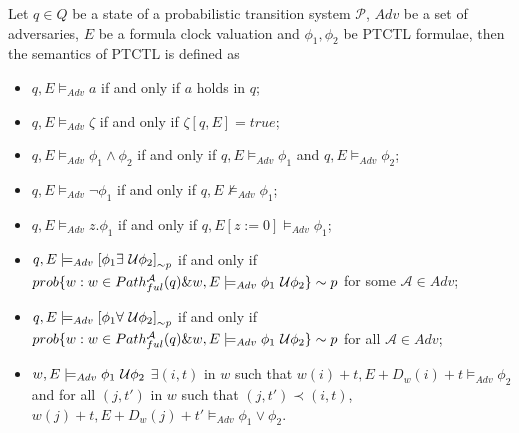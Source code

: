 \begin{defi}
Let $q\in Q$ be a state of a probabilistic transition system $\mathcal{P}$, $Adv$ be a set of adversaries, $E$ be a formula clock valuation and $\phi_{1},\phi_{2}$ be PTCTL formulae, then the semantics of PTCTL is defined as
\begin{itemize}
    \item $q,E\models_{Adv}a$ if and only if $a$ holds in $q$;
    \item $q,E\models_{Adv}\zeta$ if and only if $\zeta[q,E]=true$;
    \item $q,E\models_{Adv}\phi_{1}\land\phi_{2}$ if and only if $q,E\models_{Adv}\phi_{1}$ and $q,E\models_{Adv}\phi_{2}$;
    \item $q,E\models_{Adv}\lnot\phi_{1}$ if and only if $q,E\not\models_{Adv}\phi_{1}$;
    \item $q,E\models_{Adv}z.\phi_{1}$ if and only if $q,E[z:=0]\models_{Adv}\phi_{1}$;
    \item $q,E\models_{Adv}\left[\phi_{1}\exists\ \mathcal{U}\phi_{2}\right]_{\sim p}$ if and only if $prob\{w : w\in Path_{ful}^\mathcal{A}(q) \& w,E \models_{Adv}\phi_{1}\ \mathcal{U}\phi_{2}\} \sim p$ for some $\mathcal{A}\in Adv$;
    \item $q,E\models_{Adv}\left[\phi_{1}\forall\ \mathcal{U}\phi_{2}\right]_{\sim p}$ if and only if $prob\{w : w\in Path_{ful}^\mathcal{A}(q) \& w,E \models_{Adv}\phi_{1}\ \mathcal{U}\phi_{2}\} \sim p$ for all $\mathcal{A}\in Adv$;
    \item $w,E\models_{Adv}\phi_{1}\ \mathcal{U}\phi_{2}$ $\exists(i,t)$ in $w$ such that $w(i)+t,E+D_{w}(i)+t\models_{Adv}\phi_{2}$ and for all $(j,t')$ in $w$ such that $(j,t')\prec(i,t)$, $w(j)+t,E+D_{w}(j)+t'\models_{Adv}\phi_{1}\lor\phi_{2}$.
\end{itemize}
\end{defi}

